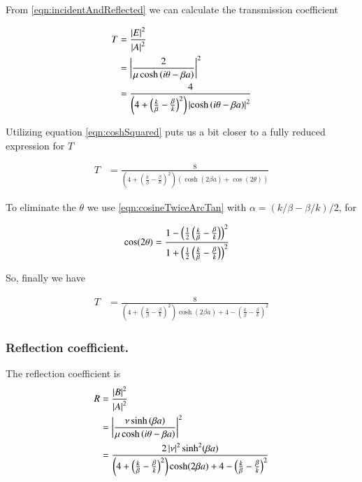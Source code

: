 \documentclass{article}
\begin{document}
From \ref{eqn:incidentAndReflected} we can calculate the transmission
coefficient

\begin{align*}
T &= \frac{\left\lvert{E}\right\rvert^2}{\left\lvert{A}\right\rvert^2} \\
&= \left\lvert{\frac{2  } { \mu \cosh\left( i\theta -\beta a \right) }}\right\rvert^2 \\
&= \frac{4} { 
\left(4 + \left( \frac{k}{\beta} -\frac{\beta}{k} \right)^2 \right)
\left\lvert{\cosh\left( i\theta -\beta a \right)}\right\rvert^2 }
\end{align*}

Utilizing equation \ref{eqn:coshSquared}
puts us a bit closer to a fully reduced expression for $T$

\begin{align*}
T 
&= \frac{8} { 
\left(4 + \left( \frac{k}{\beta} -\frac{\beta}{k} \right)^2 \right)
\left( \cosh(2\beta a) + \cos(2\theta) \right)
}
\end{align*}

To eliminate the $\theta$ we use \ref{eqn:cosineTwiceArcTan}
with $\alpha = ({k}/{\beta} - {\beta}/{k} )/2$, for

\begin{align*}
\cos(2\theta) 
&= 
\frac{ 1 - \left(\frac{1}{2} \left(\frac{k}{\beta} - \frac{\beta}{k} \right)\right)^2 }
{1 + \left(\frac{1}{2} \left(\frac{k}{\beta} - \frac{\beta}{k} \right)\right)^2}
\end{align*}

So, finally we have

\begin{align}
T 
&= \frac{8} { 
\left(4 + \left( \frac{k}{\beta} -\frac{\beta}{k} \right)^2 \right)
\cosh(2\beta a)
+ 
4 - \left(\frac{k}{\beta} - \frac{\beta}{k} \right)^2 
}
\end{align}

\subsubsection{ Reflection coefficient. }

The reflection coefficient is
\begin{align*}
R &= \frac{\left\lvert{B}\right\rvert^2}{\left\lvert{A}\right\rvert^2} \\
&= 
\left\lvert{\frac{\nu \sinh\left( \beta a \right) }
{\mu \cosh\left( i\theta -\beta a \right) }}\right\rvert^2 \\
&= \frac{2 \left\lvert{\nu}\right\rvert^2 \sinh^2( \beta a)} { 
\left(4 + \left( \frac{k}{\beta} -\frac{\beta}{k} \right)^2 \right)
\cosh(2\beta a)
+ 
4 - \left(\frac{k}{\beta} - \frac{\beta}{k} \right)^2 
}
\end{align*}
\end{document}
